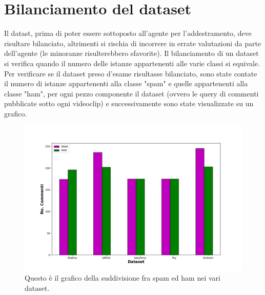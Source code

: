 \documentclass{report}
\begin{document}
   

    \section{Bilanciamento del dataset}
    
    Il datast, prima di poter essere sottoposto all'agente per l'addestramento, deve risultare bilanciato,
    altrimenti si rischia di incorrere in errate valutazioni da parte dell'agente (le minoranze risulterebbero sfavorite).
    \newline
    Il bilanciamento di un dataset si verifica quando il numero delle istanze appartenenti alle varie classi si equivale.
    Per verificare se il dataset preso d'esame risultasse bilanciato, sono state contate il numero di istanze appartenenti 
    alla classe "spam" e quelle appartenenti alla classe "ham", per ogni pezzo componente il dataset (ovvero le query di 
    commenti pubblicate sotto ogni videoclip) e successivamente sono state visualizzate su un grafico.
    
    \begin{figure}[h]
        \centering
        \includegraphics[width = \textwidth]{immagini/DatasetSeparati.png}
        \caption{Questo è il grafico della suddivisione fra spam ed ham nei vari dataset.}

    \end{figure}
    
\end{document}
